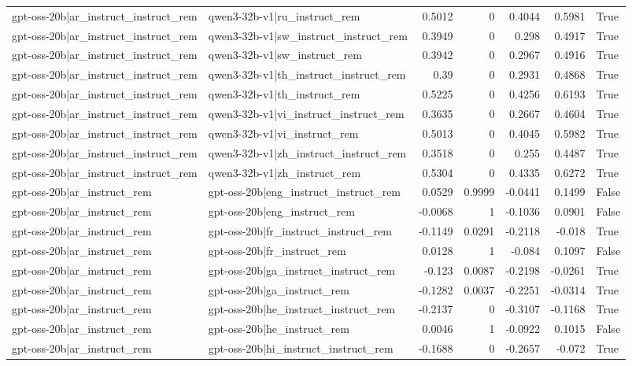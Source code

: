 \begin{table}
\begin{tabular}{l l r r r r l}
gpt-oss-20b|ar_instruct_instruct_rem & qwen3-32b-v1|ru_instruct_rem & 0.5012 & 0 & 0.4044 & 0.5981 & True \\
gpt-oss-20b|ar_instruct_instruct_rem & qwen3-32b-v1|sw_instruct_instruct_rem & 0.3949 & 0 & 0.298 & 0.4917 & True \\
gpt-oss-20b|ar_instruct_instruct_rem & qwen3-32b-v1|sw_instruct_rem & 0.3942 & 0 & 0.2967 & 0.4916 & True \\
gpt-oss-20b|ar_instruct_instruct_rem & qwen3-32b-v1|th_instruct_instruct_rem & 0.39 & 0 & 0.2931 & 0.4868 & True \\
gpt-oss-20b|ar_instruct_instruct_rem & qwen3-32b-v1|th_instruct_rem & 0.5225 & 0 & 0.4256 & 0.6193 & True \\
gpt-oss-20b|ar_instruct_instruct_rem & qwen3-32b-v1|vi_instruct_instruct_rem & 0.3635 & 0 & 0.2667 & 0.4604 & True \\
gpt-oss-20b|ar_instruct_instruct_rem & qwen3-32b-v1|vi_instruct_rem & 0.5013 & 0 & 0.4045 & 0.5982 & True \\
gpt-oss-20b|ar_instruct_instruct_rem & qwen3-32b-v1|zh_instruct_instruct_rem & 0.3518 & 0 & 0.255 & 0.4487 & True \\
gpt-oss-20b|ar_instruct_instruct_rem & qwen3-32b-v1|zh_instruct_rem & 0.5304 & 0 & 0.4335 & 0.6272 & True \\
gpt-oss-20b|ar_instruct_rem & gpt-oss-20b|eng_instruct_instruct_rem & 0.0529 & 0.9999 & -0.0441 & 0.1499 & False \\
gpt-oss-20b|ar_instruct_rem & gpt-oss-20b|eng_instruct_rem & -0.0068 & 1 & -0.1036 & 0.0901 & False \\
gpt-oss-20b|ar_instruct_rem & gpt-oss-20b|fr_instruct_instruct_rem & -0.1149 & 0.0291 & -0.2118 & -0.018 & True \\
gpt-oss-20b|ar_instruct_rem & gpt-oss-20b|fr_instruct_rem & 0.0128 & 1 & -0.084 & 0.1097 & False \\
gpt-oss-20b|ar_instruct_rem & gpt-oss-20b|ga_instruct_instruct_rem & -0.123 & 0.0087 & -0.2198 & -0.0261 & True \\
gpt-oss-20b|ar_instruct_rem & gpt-oss-20b|ga_instruct_rem & -0.1282 & 0.0037 & -0.2251 & -0.0314 & True \\
gpt-oss-20b|ar_instruct_rem & gpt-oss-20b|he_instruct_instruct_rem & -0.2137 & 0 & -0.3107 & -0.1168 & True \\
gpt-oss-20b|ar_instruct_rem & gpt-oss-20b|he_instruct_rem & 0.0046 & 1 & -0.0922 & 0.1015 & False \\
gpt-oss-20b|ar_instruct_rem & gpt-oss-20b|hi_instruct_instruct_rem & -0.1688 & 0 & -0.2657 & -0.072 & True \\

\end{tabular}
\end{table}
